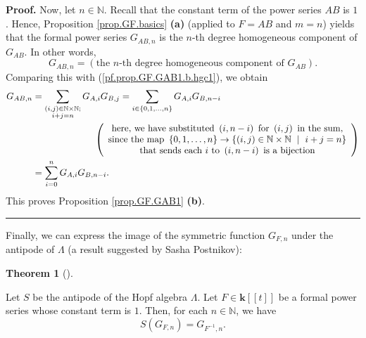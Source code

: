 \documentclass[numbers=enddot,12pt,final,onecolumn,notitlepage]{scrartcl}%
\theoremstyle{definition}
\newtheorem{theo}{Theorem}[section]
\newenvironment{theorem}[1][]
{\begin{theo}[#1]\begin{leftbar}}
{\end{leftbar}\end{theo}}
\newenvironment{proof}[1][Proof]{\noindent\textbf{#1.} }{\ \rule{0.5em}{0.5em}}
\let\sumnonlimits\sum
\renewcommand{\sum}{\sumnonlimits\limits}
\newenvironment{verlong}{}{}
\begin{document}
\begin{verlong}
\begin{proof}
Now, let $n\in\mathbb{N}$. Recall that the constant term of the power series
$AB$ is $1$. Hence, Proposition \ref{prop.GF.basics} \textbf{(a)} (applied to
$F=AB$ and $m=n$) yields that the formal power series $G_{AB,n}$ is the $n$-th
degree homogeneous component of $G_{AB}$. In other words,%
\[
G_{AB,n}=\left(  \text{the }n\text{-th degree homogeneous component of }%
G_{AB}\right)  .
\]
Comparing this with (\ref{pf.prop.GF.GAB1.b.hgc1}), we obtain%
\begin{align*}
G_{AB,n}  &  =\sum_{\substack{\left(  i,j\right)  \in\mathbb{N}\times
\mathbb{N};\\i+j=n}}G_{A,i}G_{B,j}=\sum_{i\in\left\{  0,1,\ldots,n\right\}
}G_{A,i}G_{B,n-i}\\
&  \ \ \ \ \ \ \ \ \ \ \ \ \ \ \ \ \ \ \ \ \left(
\begin{array}
[c]{c}%
\text{here, we have substituted }\left(  i,n-i\right)  \text{ for }\left(
i,j\right)  \text{ in the sum,}\\
\text{since the map }\left\{  0,1,\ldots,n\right\}  \rightarrow\left\{
\left(  i,j\right)  \in\mathbb{N}\times\mathbb{N}\ \mid\ i+j=n\right\} \\
\text{that sends each }i\text{ to }\left(  i,n-i\right)  \text{ is a
bijection}%
\end{array}
\right) \\
&  =\sum_{i=0}^{n}G_{A,i}G_{B,n-i}.
\end{align*}
This proves Proposition \ref{prop.GF.GAB1} \textbf{(b)}.
\end{proof}
\end{verlong}

Finally, we can express the image of the symmetric function $G_{F,n}$ under
the antipode of $\Lambda$ (a result suggested by Sasha Postnikov):

\begin{theorem}
\label{thm.GF.antipode}Let $S$ be the antipode of the Hopf algebra $\Lambda$.
Let $F\in\mathbf{k}\left[  \left[  t\right]  \right]  $ be a formal power
series whose constant term is $1$. Then, for each $n\in\mathbb{N}$, we have%
\begin{equation}
S\left(  G_{F,n}\right)  =G_{F^{-1},n}. \label{eq.thm.GF.antipode.eq}%
\end{equation}

\end{theorem}
\end{document}

